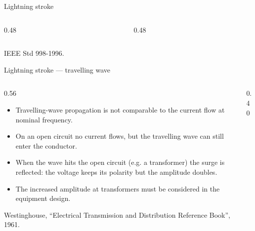 \begin{frame}{Lightning stroke}
  \begin{columns}[c,onlytextwidth]
    \begin{column}{0.48\textwidth}
      \centering
    \end{column}
    \begin{column}{0.48\textwidth}
      \centering
    \end{column}
  \end{columns}
  \vspace{0.3em}
  {\color{atGray}\footnotesize IEEE Std 998-1996.}
\end{frame}

\begin{frame}{Lightning stroke --- travelling wave}
  \begin{columns}[c,onlytextwidth]
    \begin{column}{0.56\textwidth}
      \begin{itemize}
        \setlength{\itemsep}{0.4em}
        \item Travelling-wave propagation is not comparable to the current
              flow at nominal frequency.
        \item On an open circuit no current flows, but the travelling wave
              can still enter the conductor.
        \item When the wave hits the open circuit (e.g. a transformer) the
              surge is reflected: the voltage keeps its polarity but the
              amplitude doubles.
        \item The increased amplitude at transformers must be considered in
              the equipment design.
      \end{itemize}
      \vspace{0.2em}
      {\color{atGray}\footnotesize Westinghouse, ``Electrical Transmission
      and Distribution Reference Book'', 1961.}
    \end{column}
    \begin{column}{0.40\textwidth}
      \centering
    \end{column}
  \end{columns}
\end{frame}


